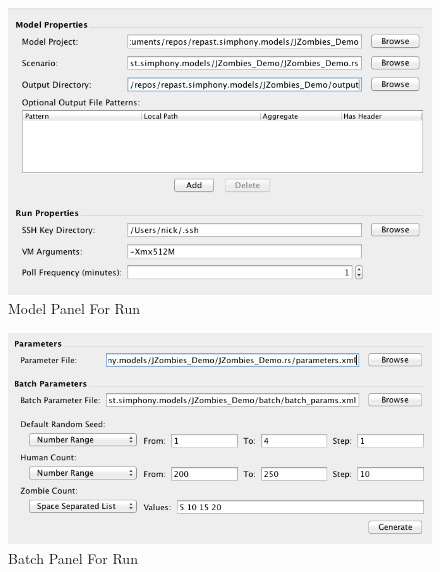 \documentclass[11pt]{amsart}
\begin{document}
\begin{figure}[h]
\begin{center}
\vspace{.2in}
\centerline {
\includegraphics[width=6in]{images/model_panel_run.png}
}
\caption{Model Panel For Run}
\label{fig:model_panel_run}
\end{center}
\end{figure}

\begin{figure}[h]
\begin{center}
\vspace{.2in}
\centerline {
\includegraphics[width=6in]{images/batch_panel_run.png}
}
\caption{Batch Panel For Run}
\label{fig:batch_panel_run}
\end{center}
\end{figure}
\end{document}
